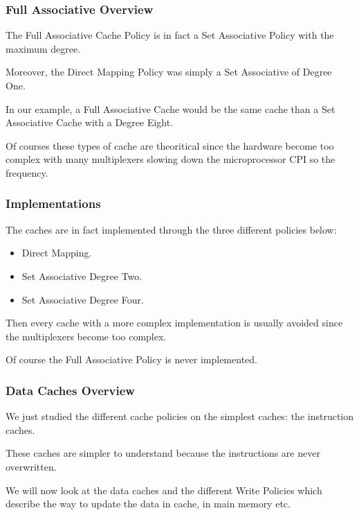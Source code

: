 
\begin{frame}
  \frametitle{Full Associative Overview}

  The Full Associative Cache Policy is in fact a Set Associative Policy
  with the maximum degree.

  \-

  Moreover, the Direct Mapping Policy was simply a Set Associative of
  Degree One.

  \-

  In our example, a Full Associative Cache would be the same cache than a
  Set Associative Cache with a Degree Eight.

  \-

  Of courses these types of cache are theoritical since the
  hardware become too complex with many multiplexers slowing down
  the microprocessor CPI so the frequency.
\end{frame}


\begin{frame}
  \frametitle{Implementations}

  The caches are in fact implemented through the three different policies
  below:

  \begin{itemize}[<+->]
    \item
      Direct Mapping.
    \item
      Set Associative Degree Two.
    \item
      Set Associative Degree Four.
  \end{itemize}

  Then every cache with a more complex implementation is usually avoided
  since the multiplexers become too complex.

  \-

  Of course the Full Associative Policy is never implemented.
\end{frame}


\begin{frame}
  \frametitle{Data Caches Overview}

  We just studied the different cache policies on the simplest caches:
  the instruction caches.

  \-

  These caches are simpler to understand because the instructions are
  never overwritten.

  \-

  We will now look at the data caches and the different Write Policies
  which describe the way to update the data in cache, in main memory etc.
\end{frame}

